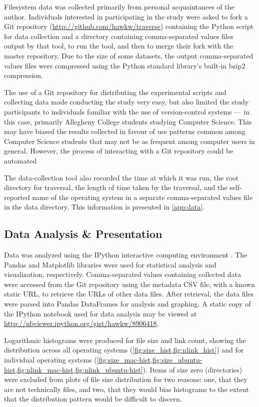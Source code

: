 \documentclass[12pt,letterpaper]{article}
\begin{document}
			Filesystem data was collected primarily from personal acquaintances of the author. Individuals interested in participating in the study were asked to fork a Git repository (\url{http://github.com/hawkw/traverse}) containing the Python script for data collection and a directory containing comma-separated values files output by that tool, to run the tool, and then to merge their fork with the master repository. Due to the size of some datasets, the output comma-separated values files were compressed using the Python standard library's built-in bzip2 compression.

			The use of a Git repository for distributing the experimental scripts and collecting data made conducting the study very easy, but also limited the study participants to individuals familiar with the use of version-control systems --- in this case, primarily Allegheny College students studying Computer Science. This may have biased the results collected in favour of use patterns common among Computer Science students that may not be as frequent among computer users in general. However, the process of interacting with a Git repository could be automated 

			The data-collection tool also recorded the time at which it was run, the root directory for traversal, the length of time taken by the traversal,  and the self-reported name of the operating system in a separate comma-separated values file in the data directory. This information is presented in \cref{app:data}.

		\subsection{Data Analysis \& Presentation}

			Data was analyzed using the IPython interactive computing environment \cite{ipython}. The Pandas and Matplotlib libraries \cite{pandas,matplotlib} were used for statistical analysis and visualization, respectively. Comma-separated values containing collected data were accessed from the Git repository using the metadata CSV file, with a known static URL, to retrieve the URLs of other data files. After retrieval, the data files were parsed into Pandas DataFrames for analysis and graphing. A static copy of the IPython notebook used for data analysis may be viewed at \allowbreak\url{http://nbviewer.ipython.org/gist/hawkw/8906418}.

			Logarithmic histograms were produced for file size and link count, showing the distribution across all operating systems (\cref{fig:size_hist,fig:nlink_hist}) and for individual operating systems (\cref{fig:size_mac-hist,fig:size_ubuntu-hist,fig:nlink_mac-hist,fig:nlink_ubuntu-hist}). Items of size zero (directories) were excluded from plots of file size distribution for two reasons: one, that they are not technically files, and two, that they would bias histograms to the extent that the distribution pattern would be difficult to discern.
\end{document}
